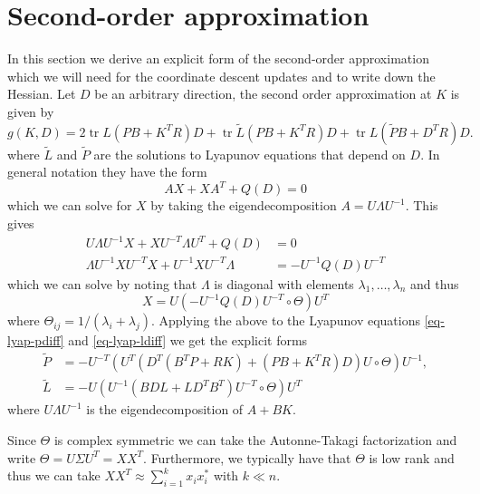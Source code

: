 \documentclass[12pt]{article}
\DeclareMathOperator*{\tr}{\mathrm{tr}}
\begin{document}
\section{Second-order approximation}

In this section we derive an explicit form of the second-order approximation
which we will need for the coordinate descent updates and to write down the
Hessian. Let $D$ be an arbitrary direction, the second order approximation at $K$ is
given by
\begin{equation}
\label{eq-approx}
g(K,D) = 2 \tr L(PB + K^TR)D + \tr \tilde{L}(PB + K^TR)D + \tr L(\tilde{P}B + D^TR)D.
\end{equation}
where $\tilde{L}$ and $\tilde{P}$ are the solutions to Lyapunov equations that
depend on $D$. In general notation they have the form
\begin{equation}
AX + XA^T + Q(D) = 0
\end{equation}
which we can solve for $X$ by taking the eigendecomposition $A = U\Lambda U^{-1}$. This gives
\begin{equation}
\begin{split}
U\Lambda U^{-1}X + XU^{-T}\Lambda U^T + Q(D) &= 0 \\
\Lambda U^{-1}XU^{-T}X + U^{-1}XU^{-T}\Lambda &= -U^{-1}Q(D)U^{-T}
\end{split}
\end{equation}
which we can solve by noting that $\Lambda$ is diagonal with elements
$\lambda_1,\ldots,\lambda_n$ and thus
\begin{equation}
\label{eq-lyap-explicit}
X = U(-U^{-1}Q(D)U^{-T} \circ \Theta)U^T
\end{equation}
where $\Theta_{ij} = 1 /(\lambda_i + \lambda_j)$. Applying the above to the
Lyapunov equations \eqref{eq-lyap-pdiff} and  \eqref{eq-lyap-ldiff} we get the
explicit forms
\begin{equation}
\label{eq-lyap-explicit-diff}
\begin{split}
\tilde{P} &= -U^{-T} \left(U^T (D^T(B^TP + RK) + (PB +
K^TR)D) U \circ \Theta \right)U^{-1}, \\
\tilde{L} &= -U \left( U^{-1} (BDL + LD^TB^T) U^{-T} \circ \Theta \right) U^T
\end{split}
\end{equation}
where $U\Lambda U^{-1}$ is the eigendecomposition of $A + BK$.

Since $\Theta$ is complex symmetric we can take the Autonne-Takagi factorization and
write $\Theta = U\Sigma U^T = XX^T$. Furthermore, we typically have that
$\Theta$ is low rank and thus we can take $XX^T \approx \sum_{i=1}^k x_ix_i^*$
with $k \ll n$.
\end{document}
